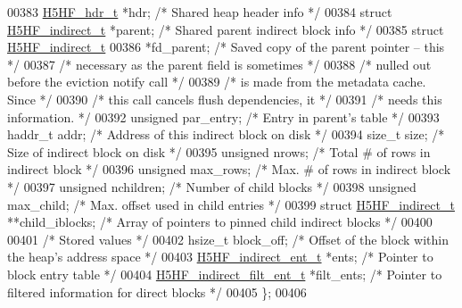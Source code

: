 \begin{DoxyCode}
00383     \hyperlink{struct_h5_h_f__hdr__t}{H5HF\_hdr\_t}    *hdr;           \textcolor{comment}{/* Shared heap header info                */}
00384     \textcolor{keyword}{struct }\hyperlink{struct_h5_h_f__indirect__t}{H5HF\_indirect\_t} *parent;  \textcolor{comment}{/* Shared parent indirect block info  */}
00385     \textcolor{keyword}{struct }\hyperlink{struct_h5_h_f__indirect__t}{H5HF\_indirect\_t} 
00386         *fd\_parent; \textcolor{comment}{/* Saved copy of the parent pointer -- this   */}
00387                 \textcolor{comment}{/* necessary as the parent field is sometimes */}
00388                 \textcolor{comment}{/* nulled out before the eviction notify call */}
00389                 \textcolor{comment}{/* is made from the metadata cache.  Since    */}
00390                 \textcolor{comment}{/* this call cancels flush dependencies, it   */}
00391                 \textcolor{comment}{/* needs this information.            */}
00392     \textcolor{keywordtype}{unsigned}    par\_entry;      \textcolor{comment}{/* Entry in parent's table                    */}
00393     haddr\_t     addr;           \textcolor{comment}{/* Address of this indirect block on disk     */}
00394     \textcolor{keywordtype}{size\_t}      size;           \textcolor{comment}{/* Size of indirect block on disk             */}
00395     \textcolor{keywordtype}{unsigned}    nrows;          \textcolor{comment}{/* Total # of rows in indirect block          */}
00396     \textcolor{keywordtype}{unsigned}    max\_rows;       \textcolor{comment}{/* Max. # of rows in indirect block           */}
00397     \textcolor{keywordtype}{unsigned}    nchildren;      \textcolor{comment}{/* Number of child blocks                     */}
00398     \textcolor{keywordtype}{unsigned}    max\_child;      \textcolor{comment}{/* Max. offset used in child entries          */}
00399     \textcolor{keyword}{struct }\hyperlink{struct_h5_h_f__indirect__t}{H5HF\_indirect\_t} **child\_iblocks; \textcolor{comment}{/* Array of pointers to pinned child indirect
       blocks */}
00400 
00401     \textcolor{comment}{/* Stored values */}
00402     hsize\_t     block\_off;      \textcolor{comment}{/* Offset of the block within the heap's address space */}
00403     \hyperlink{struct_h5_h_f__indirect__ent__t}{H5HF\_indirect\_ent\_t} *ents;  \textcolor{comment}{/* Pointer to block entry table               */}
00404     \hyperlink{struct_h5_h_f__indirect__filt__ent__t}{H5HF\_indirect\_filt\_ent\_t} *filt\_ents;    \textcolor{comment}{/* Pointer to filtered information for
       direct blocks */}
00405 \};
00406 

\end{DoxyCode}
